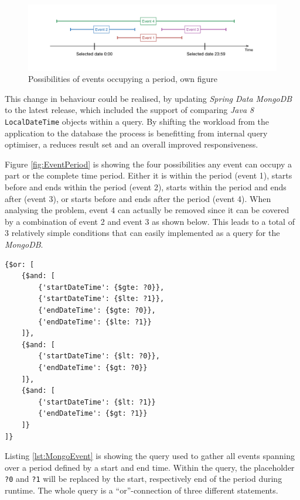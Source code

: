 \begin{figure}[h]
  	\centering
  	\includegraphics[width=0.9\linewidth]{./images/event-period.png}
  	\caption{Possibilities of events occupying a period, own figure}
	\label{fig:EventPeriod}
\end{figure}

This change in behaviour could be realised, by updating \emph{Spring Data MongoDB} to the latest release, which included the support of comparing \emph{Java 8} \texttt{LocalDateTime} objects within a query. By shifting the workload from the application to the database the process is benefitting from internal query optimiser, a reduces result set and an overall improved responsiveness. 

Figure \vref{fig:EventPeriod} is showing the four possibilities any event can occupy a part or the complete time period. Either it is within the period (event 1), starts before and ends within the period (event 2), starts within the period and ends after (event 3), or starts before and ends after the period (event 4). When analysing the problem, event 4 can actually be removed since it can be covered by a combination of event 2 and event 3 as shown below. This leads to a total of 3 relatively simple conditions that can easily implemented as a query for the \emph{MongoDB}.

\begin{lstlisting}[caption ={MongoDB query for getting events over a period}, label=lst:MongoEvent]
{$or: [
	{$and: [
		{'startDateTime': {$gte: ?0}},
		{'startDateTime': {$lte: ?1}},
		{'endDateTime': {$gte: ?0}},
		{'endDateTime': {$lte: ?1}}
	]},
	{$and: [
		{'startDateTime': {$lt: ?0}},
		{'endDateTime': {$gt: ?0}}
	]},
	{$and: [
		{'startDateTime': {$lt: ?1}}
		{'endDateTime': {$gt: ?1}}
	]}
]}
\end{lstlisting}

Listing \ref{lst:MongoEvent} is showing the query used to gather all events spanning over a period defined by a start and end time. Within the query, the placeholder \texttt{?0} and \texttt{?1} will be replaced by the start, respectively end of the period during runtime. The whole query is a \enquote{or}-connection of three different statements. 


